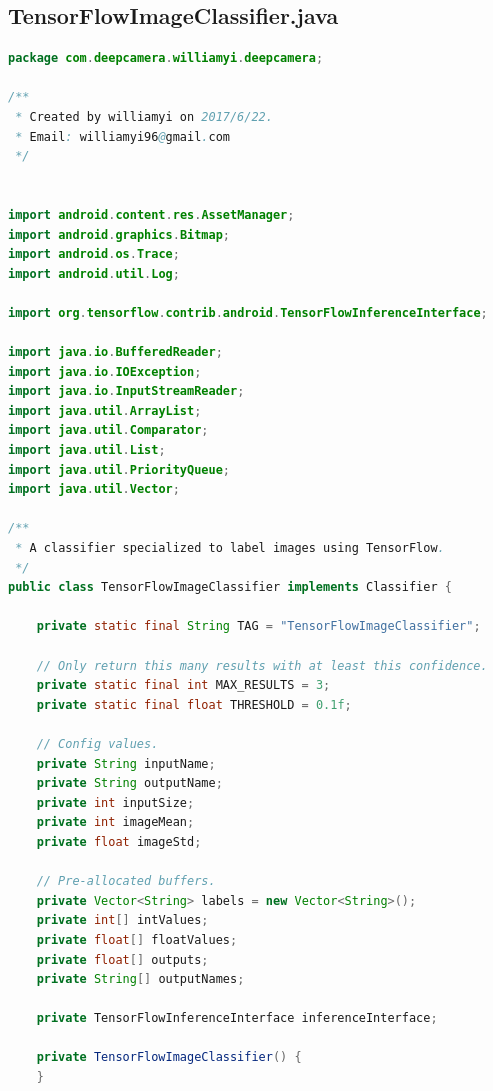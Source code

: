 \documentclass[UTF8, Microsoft YaHei]{book}
\begin{document}
    \subsection{TensorFlowImageClassifier.java}
\begin{small}
\begin{lstlisting}[language=java]
package com.deepcamera.williamyi.deepcamera;

/**
 * Created by williamyi on 2017/6/22.
 * Email: williamyi96@gmail.com
 */


import android.content.res.AssetManager;
import android.graphics.Bitmap;
import android.os.Trace;
import android.util.Log;

import org.tensorflow.contrib.android.TensorFlowInferenceInterface;

import java.io.BufferedReader;
import java.io.IOException;
import java.io.InputStreamReader;
import java.util.ArrayList;
import java.util.Comparator;
import java.util.List;
import java.util.PriorityQueue;
import java.util.Vector;

/**
 * A classifier specialized to label images using TensorFlow.
 */
public class TensorFlowImageClassifier implements Classifier {

    private static final String TAG = "TensorFlowImageClassifier";

    // Only return this many results with at least this confidence.
    private static final int MAX_RESULTS = 3;
    private static final float THRESHOLD = 0.1f;

    // Config values.
    private String inputName;
    private String outputName;
    private int inputSize;
    private int imageMean;
    private float imageStd;

    // Pre-allocated buffers.
    private Vector<String> labels = new Vector<String>();
    private int[] intValues;
    private float[] floatValues;
    private float[] outputs;
    private String[] outputNames;

    private TensorFlowInferenceInterface inferenceInterface;

    private TensorFlowImageClassifier() {
    }


\end{lstlisting}
\end{small}
\end{document}
